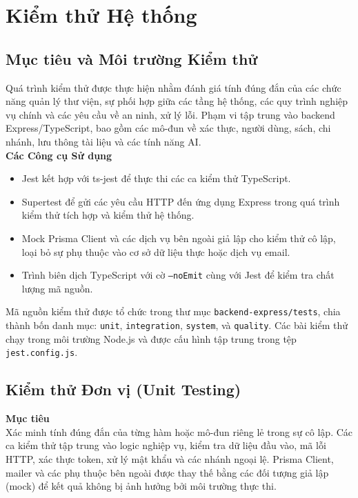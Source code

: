 \section{Kiểm thử Hệ thống}

\subsection{Mục tiêu và Môi trường Kiểm thử}

Quá trình kiểm thử được thực hiện nhằm đánh giá tính đúng đắn của các chức năng quản lý thư viện, sự phối hợp giữa các tầng hệ thống, các quy trình nghiệp vụ chính và các yêu cầu về an ninh, xử lý lỗi. Phạm vi tập trung vào backend Express/TypeScript, bao gồm các mô-đun về xác thực, người dùng, sách, chi nhánh, lưu thông tài liệu và các tính năng AI.\\

\textbf{Các Công cụ Sử dụng}
\begin{itemize}
        \item Jest kết hợp với ts-jest để thực thi các ca kiểm thử TypeScript.
        \item Supertest để gửi các yêu cầu HTTP đến ứng dụng Express trong quá trình kiểm thử tích hợp và kiểm thử hệ thống.
        \item Mock Prisma Client và các dịch vụ bên ngoài giả lập cho kiểm thử cô lập, loại bỏ sự phụ thuộc vào cơ sở dữ liệu thực hoặc dịch vụ email.
        \item Trình biên dịch TypeScript với cờ \texttt{--noEmit} cùng với Jest để kiểm tra chất lượng mã nguồn.
\end{itemize}

\noindent Mã nguồn kiểm thử được tổ chức trong thư mục \texttt{backend-express/tests}, chia thành bốn danh mục: \texttt{unit}, \texttt{integration}, \texttt{system}, và \texttt{quality}. Các bài kiểm thử chạy trong môi trường Node.js và được cấu hình tập trung trong tệp \texttt{jest.config.js}.

\subsection{Kiểm thử Đơn vị (Unit Testing)}

\textbf{Mục tiêu} \\

Xác minh tính đúng đắn của từng hàm hoặc mô-đun riêng lẻ trong sự cô lập. Các ca kiểm thử tập trung vào logic nghiệp vụ, kiểm tra dữ liệu đầu vào, mã lỗi HTTP, xác thực token, xử lý mật khẩu và các nhánh ngoại lệ. Prisma Client, mailer và các phụ thuộc bên ngoài được thay thế bằng các đối tượng giả lập (mock) để kết quả không bị ảnh hưởng bởi môi trường thực thi.\\

